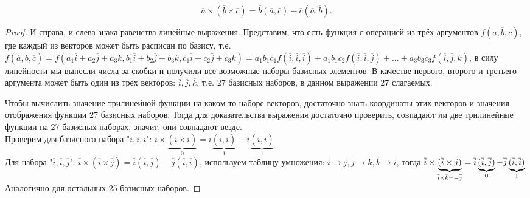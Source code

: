 	\begin{Prop}
		$$\overline{a} \times (\overline{b} \times \overline{c}) = \overline{b}(\overline{a}, \overline{c}) - \overline{c}(\overline{a}, \overline{b}).$$
	\end{Prop}
		
	\begin{proof}
		И справа, и слева знака равенства линейные выражения. Представим, что есть функция с операцией из трёх аргументов $f(\overline{a}, \overline{b}, \overline{c})$, где каждый из векторов может быть расписан по базису, т.е. $f(\overline{a}, \overline{b}, \overline{c}) = f(a_1 \overline{i} + a_2 \overline{j} +a_3 \overline{k}, b_1 \overline{i} + b_2 \overline{j} + b_3 \overline{k}, c_1 \overline{i} + c_2 \overline{j} + c_3 \overline{k})
		= a_1 b_1 c_1 f(\overline{i}, \overline{i}, \overline{i}) + a_1 b_1 c_2 f(\overline{i}, \overline{i}, \overline{j}) + ... + a_3 b_3 c_3 f(\overline{i}, \overline{j}, \overline{k})$, в силу линейности мы вынесли числа за скобки и получили все возможные наборы базисных элементов. В качестве первого, второго и третьего аргумента может быть один из трёх векторов: $\overline{i}, \overline{j}, \overline{k}$, т.е. 27 базисных наборов, в данном выражении 27 слагаемых. 

		Чтобы вычислить значение трилинейной функции на каком-то наборе векторов, достаточно знать координаты этих векторов и значения отображения функции 27 базисных наборов.
		Тогда для доказательства выражения достаточно проверить, совпадают ли две трилинейные функции на 27 базисных наборах, значит, они совпадают везде.\\
		Проверим для базисного набора "$\overline{i}, \overline{i}, \overline{i}$": $\overline{i} \times \underbrace{(\overline{i} \times \overline{i})}_{0} = \overline{i} \underbrace{(\overline{i}, \overline{i})}_{1} - \overline{i}\underbrace{(\overline{i}, \overline{i})}_{1}$\\
		Для набора "$\overline{i}, \overline{i}, \overline{j}$": $\overline{i} \times (\overline{i} \times \overline{j}) = \overline{i}(\overline{i}, \overline{j}) - \overline{j}(\overline{i}, \overline{i})$, используем таблицу умножения: $i \to j, j \to k, k \to i$, тогда $\overline{i} \times \underbrace{(\overline{i} \times j)}_{\overline{i} \times \overline{k} = - \overline{j} } = \overline{i}\underbrace{(\overline{i}, \overline{j})}_0 - \overline{j}\underbrace{(\overline{i}, \overline{i})}_1\\$
		Аналогично для остальных 25 базисных наборов.
	\end{proof}

